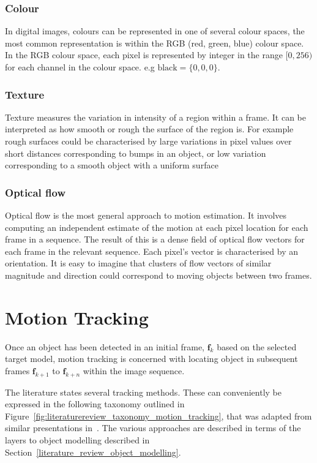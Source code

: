 \subsubsection{Colour}
In digital images, colours can be represented in one of several colour spaces, the
most common representation is within the RGB (red, green, blue) colour space. In
the RGB colour space, each pixel is represented by integer in the range $[0,256)$ 
for each channel in the colour space. e.g $\text{black} = \{0,0,0\}$.

\subsubsection{Texture}
Texture measures the variation in intensity of a region within a frame. It can
be interpreted as how smooth or rough the surface of the region is.
For example rough surfaces could be characterised by large variations in pixel
values over short distances corresponding to bumps in an object, or low
variation corresponding to a smooth object with a uniform surface~\cite{Porikli2012}

\subsubsection{Optical flow}
Optical flow is the most general approach to motion estimation. It involves
computing an independent estimate of the motion at each pixel location for each
frame in a sequence.
The result of this is a dense field of optical flow vectors for each frame in
the relevant sequence. Each pixel's vector is characterised by an orientation.
It is easy to imagine that clusters of flow vectors of similar magnitude and
direction could correspond to moving objects between two
frames\cite{Szeliski2010}.

\section{Motion Tracking}
Once an object has been detected in an initial frame, $\mathbf{f}_k$ based on the selected
target model, motion tracking is concerned with locating object in subsequent
frames $\mathbf{f}_{k+1}$ to $\mathbf{f}_{k+n}$ within the image sequence. 

The literature states several tracking methods. These can
conveniently be expressed in the following taxonomy outlined in
Figure~\ref{fig:literaturereview_taxonomy_motion_tracking}, that was adapted
from similar presentations in~\cite{Prajapati2015, Patel2013}. The various
approaches are described in terms of the layers to object modelling described in
Section~\ref{literature_review_object_modelling}.

